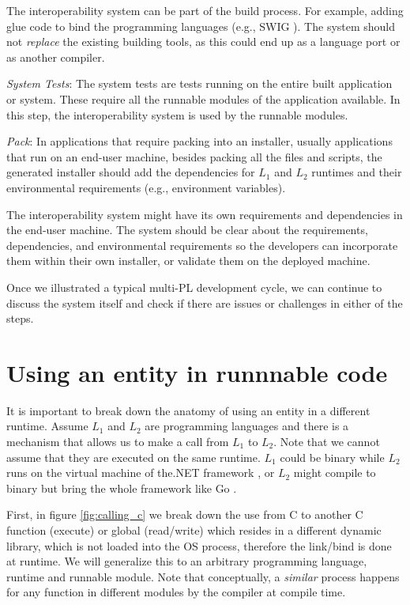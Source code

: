 \documentclass[sigplan,10pt,manuscript,nonacm]{acmart}
\begin{document}
The interoperability system can be part of the build process. For example, adding glue code to bind the programming languages (e.g., SWIG \cite{swig}). The system should not \emph{replace} the existing building tools, as this could end up as a language port or as another compiler.

\textit{System Tests}: The system tests are tests running on the entire built application or system. These require all the runnable modules of the application available. In this step, the interoperability system is used by the runnable modules.

\textit{Pack}: In applications that require packing into an installer, usually applications that run on an end-user machine, besides packing all the files and scripts, the generated installer should add the dependencies for $L_1$ and $L_2$ runtimes and their environmental requirements (e.g., environment variables).

The interoperability system might have its own requirements and dependencies in the end-user machine. The system should be clear about the requirements, dependencies, and environmental requirements so the developers can incorporate them within their own installer, or validate them on the deployed machine.

Once we illustrated a typical multi-PL development cycle, we can continue to discuss the system itself and check if there are issues or challenges in either of the steps.


\section{Using an entity in runnnable code} \label{sec:using_foreign_entity}

It is important to break down the anatomy of using an entity in a different runtime. Assume $L_1$ and $L_2$ are programming languages and there is a mechanism that allows us to make a call from $L_1$ to $L_2$. Note that we cannot assume that they are executed on the same runtime. $L_1$ could be binary while $L_2$ runs on the virtual machine of the.NET framework \cite{ms_dotnet}, or $L_2$ might compile to binary but bring the whole framework like Go \cite{golang}.

First, in figure \ref{fig:calling_c} we break down the use from C to another C function (execute) or global (read/write) which resides in a different dynamic library, which is not loaded into the OS process, therefore the link/bind is done at runtime. We will generalize this to an arbitrary programming language, runtime and runnable module. Note that conceptually, a \textit{similar} process happens for any function in different modules by the compiler at compile time.
\end{document}
